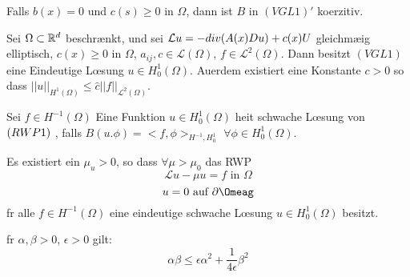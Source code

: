 \begin{lemma}{4.11}
  Falls $b(x)=0$ und $c(s)\geq 0$ in $\Omega$, dann ist $B$ in $(VGL1)'$
  koerzitiv.
\end{lemma}

\begin{satz}{4.12}
  Sei $\Omega\subset\mathbb{R}^d$ beschr\ae nkt, und sei $\mathcal{L} u=-div(A(x)Du)+c(x)U$
  gleichm\ae \s ig elliptisch, $c(x)\geq 0$ in $\Omega$,
  $a_{ij},c\in\mathcal{L}(\Omega)$, $f\in\mathcal{L}^2(\Omega)$. Dann besitzt
  $(VGL1)$ eine Eindeutige L\oe sung $u\in H^1_0(\Omega)$. Au\s erdem existiert eine
  Konstante $c>0$ so dass $||u||_{H^1(\Omega)}\leq\hat c
  ||f||_{\mathcal{L}^2(\Omega)}$.
\end{satz}

\begin{definition}{}
  Sei $f\in H^{-1}(\Omega)$ Eine Funktion $u\in H^1_0(\Omega)$ hei\s t schwache
  L\oe sung von $(RWP 1)~$, falls $B(u.\phi)=<f,\phi>_{H^{-1},H^1_0}$
  $\forall\phi\in H^1_0(\Omega)$.
\end{definition}

\begin{bem}{}
  Es existiert ein $\mu_u>0$, so dass $\forall \mu>\mu_0$ das RWP
  \[\mathcal{L}u-\mu u = f\mbox{ in } \Omega\]
  \[u=0\mbox{ auf }\partial\Omeag\]
  f\ue r alle $f\in H^{-1}(\Omega)$ eine eindeutige schwache L\oe sung
  $u\in H^1_0(\Omega)$ besitzt.
\end{bem}

\begin{lem}{}
  f\ue r $\alpha,\beta>0$, $\epsilon>0$ gilt:
  \[\alpha\beta \leq \epsilon\alpha^2+\frac{1}{4\epsilon}\beta^2\]
\end{lem}

